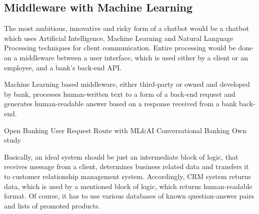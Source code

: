 \subsection{Middleware with Machine Learning}

The most ambitious, innovative and risky form of a chatbot would be a chatbot which uses Artificial Intelligence, Machine Learning and Natural Language Processing techniques for client communication.
Entire processing would be done on a middleware between a user interface, which is used either by a client or an employee, and a bank's back-end API.

Machine Learning based middleware, either third-party or owned and developed by bank, processes human-written text to a form of a back-end request and generates human-readable answer based on a response received from a bank back-end.

\mttable
{Open Banking User Request Route with ML\&AI Conversational Banking}
{Own study}
{
}

Basically, an ideal system should be just an intermediate block of logic, that receives message from a client, determines business related data and transfers it to customer relationship management system.
Accordingly, CRM system returns data, which is used by a mentioned block of logic, which returns human-readable format.
Of course, it has to use various databases of known question-answer pairs and lists of promoted products.

